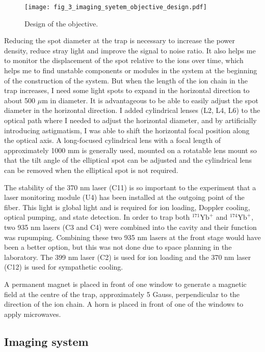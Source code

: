 \begin{figure}
    \centering
    \texttt{[image: fig\_3\_imaging\_syetem\_objective\_design.pdf]}
    \caption{Design of the objective.}
    \label{fig:fig_3_imaging_syetem_objective_design}
\end{figure}

Reducing the spot diameter at the trap is necessary to increase the power density, reduce stray light and improve the signal to noise ratio. It also helps me to monitor the displacement of the spot relative to the ions over time, which helps me to find unstable components or modules in the system at the beginning of the construction of the system. But when the length of the ion chain in the trap increases, I need some light spots to expand in the horizontal direction to about 500 $\mu$m in diameter. It is advantageous to be able to easily adjust the spot diameter in the horizontal direction. I added cylindrical lenses (L2, L4, L6) to the optical path where I needed to adjust the horizontal diameter, and by artificially introducing astigmatism, I was able to shift the horizontal focal position along the optical axis. A long-focused cylindrical lens with a focal length of approximately 1000 mm is generally used, mounted on a rotatable lens mount so that the tilt angle of the elliptical spot can be adjusted and the cylindrical lens can be removed when the elliptical spot is not required.

The stability of the 370 nm laser (C11) is so important to the experiment that a laser monitoring module (U4) has been installed at the outgoing point of the fiber. This light is global light and is required for ion loading, Doppler cooling, optical pumping, and state detection. In order to trap both ${ }^{171} \mathrm{Yb}^{+}$ and ${ }^{174} \mathrm{Yb}^{+}$, two 935 nm lasers (C3 and C4) were combined into the cavity and their function was rupumping. Combining these two 935 nm lasers at the front stage would have been a better option, but this was not done due to space planning in the laboratory. The 399 nm laser (C2) is used for ion loading and the 370 nm laser (C12) is used for sympathetic cooling.

A permanent magnet is placed in front of one window to generate a magnetic field at the centre of the trap, approximately 5 Gauss, perpendicular to the direction of the ion chain. A horn is placed in front of one of the windows to apply microwaves.

\subsection{Imaging system}

